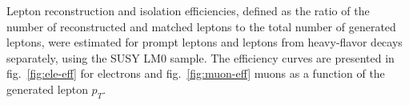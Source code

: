 Lepton reconstruction and isolation efficiencies, defined as the ratio of the number of reconstructed and matched
leptons to the total number of generated leptons, were estimated for prompt leptons and leptons from heavy-flavor decays separately, using the SUSY
LM0 sample. The efficiency curves are presented in fig.~\ref{fig:ele-eff} for electrons and fig.~\ref{fig:muon-eff}
muons as a function of the generated lepton $p_{T}$. 

